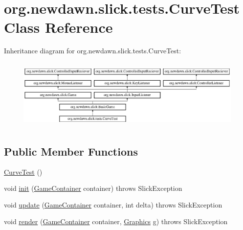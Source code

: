 \hypertarget{classorg_1_1newdawn_1_1slick_1_1tests_1_1_curve_test}{}\section{org.\+newdawn.\+slick.\+tests.\+Curve\+Test Class Reference}
\label{classorg_1_1newdawn_1_1slick_1_1tests_1_1_curve_test}
Inheritance diagram for org.\+newdawn.\+slick.\+tests.\+Curve\+Test\+:\begin{figure}[H]
\begin{center}
\leavevmode
\includegraphics[height=3.522012cm]{classorg_1_1newdawn_1_1slick_1_1tests_1_1_curve_test}
\end{center}
\end{figure}
\subsection*{Public Member Functions}
\begin{DoxyCompactItemize}
\item 
\mbox{\hyperlink{classorg_1_1newdawn_1_1slick_1_1tests_1_1_curve_test_a7b97731316fe7d7ce7cc74c697627599}{Curve\+Test}} ()
\item 
void \mbox{\hyperlink{classorg_1_1newdawn_1_1slick_1_1tests_1_1_curve_test_a810f6ca43384b5bf97a3ece6a3bb1d06}{init}} (\mbox{\hyperlink{classorg_1_1newdawn_1_1slick_1_1_game_container}{Game\+Container}} container)  throws Slick\+Exception 
\item 
void \mbox{\hyperlink{classorg_1_1newdawn_1_1slick_1_1tests_1_1_curve_test_a5b12dcc7a3c640049d0f27a04ee8ad4f}{update}} (\mbox{\hyperlink{classorg_1_1newdawn_1_1slick_1_1_game_container}{Game\+Container}} container, int delta)  throws Slick\+Exception 
\item 
void \mbox{\hyperlink{classorg_1_1newdawn_1_1slick_1_1tests_1_1_curve_test_adc127706cf50f25dc28d1a0ee9836047}{render}} (\mbox{\hyperlink{classorg_1_1newdawn_1_1slick_1_1_game_container}{Game\+Container}} container, \mbox{\hyperlink{classorg_1_1newdawn_1_1slick_1_1_graphics}{Graphics}} g)  throws Slick\+Exception 
\end{DoxyCompactItemize}
